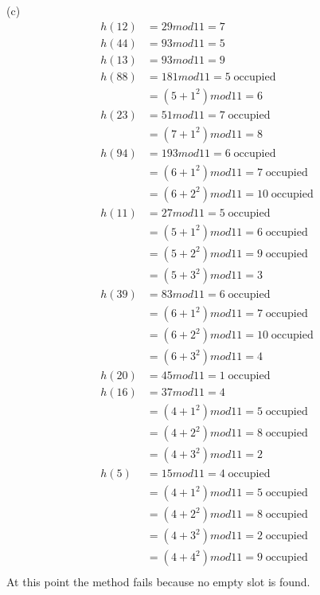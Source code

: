 \documentclass{article}
\begin{document}
(c)\\
\begin{equation*} 
\begin{split}
    h(12) &= 29mod11=7\\
    h(44) &= 93mod11=5\\
    h(13) &= 93mod11=9\\
    h(88) &= 181mod11=5 \; \text{occupied}\\
          &= (5+1^2)mod11=6\\
    h(23) &= 51mod11=7 \; \text{occupied}\\
          &= (7+1^2)mod11=8\\
    h(94) &= 193mod11=6 \; \text{occupied}\\
          &= (6+1^2)mod11=7 \; \text{occupied}\\
          &= (6+2^2)mod11=10 \; \text{occupied}\\
    h(11) &= 27mod11=5 \; \text{occupied}\\
          &= (5+1^2)mod11=6 \; \text{occupied}\\
          &= (5+2^2)mod11=9 \; \text{occupied}\\
          &= (5+3^2)mod11=3\\
    h(39) &= 83mod11=6 \; \text{occupied}\\
          &= (6+1^2)mod11=7 \; \text{occupied}\\
          &= (6+2^2)mod11=10 \; \text{occupied}\\
          &= (6+3^2)mod11=4 \\
    h(20) &= 45mod11=1 \; \text{occupied}\\
    h(16) &= 37mod11=4\\
          &= (4+1^2)mod11=5 \; \text{occupied}\\
          &= (4+2^2)mod11=8 \; \text{occupied}\\
          &= (4+3^2)mod11=2\\
    h(5) &= 15mod11=4 \; \text{occupied}\\
         &= (4+1^2)mod11=5 \; \text{occupied}\\
         &= (4+2^2)mod11=8 \; \text{occupied}\\
         &= (4+3^2)mod11=2 \; \text{occupied}\\
         &= (4+4^2)mod11=9 \; \text{occupied}\\
\end{split}
\end{equation*}
At this point the method fails because no empty slot is found.
\end{document}
